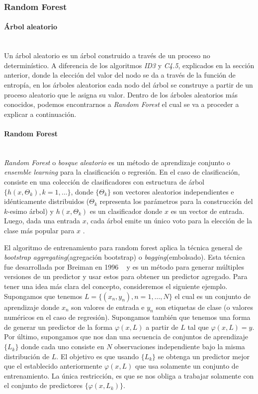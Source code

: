 \subsubsection{Random Forest}

	\paragraph{Árbol aleatorio} ~\\
	
	Un árbol aleatorio es un árbol construido a través de un proceso no determinístico. A diferencia de los algoritmos \textit{ID3} y \textit{C4.5}, explicados en la sección anterior, donde la elección del valor del nodo se da a través de la función de entropía, en los árboles aleatorios cada nodo del árbol se construye a partir de un proceso aleatorio que le asigna su valor. Dentro de los árboles aleatorios más conocidos, podemos encontrarnos a \textit{Random Forest} el cual se va a proceder a explicar a continuación.

	\paragraph{Random Forest} ~\\

	\textit{Random Forest} o \textit{bosque aleatorio} es un método de aprendizaje conjunto o\textit{ ensemble learning} para la clasificación o regresión. En el caso de clasificación, consiste en una colección de clasificadores con estructura de árbol $\{h(x,\Theta_k), k = 1,\dots\}$, donde $\{\Theta_k\}$ son vectores aleatorios independientes e idénticamente distribuidos ($\Theta_k$ representa los parámetros para la construcción del $k$-esimo árbol) y $h(x,\Theta_k)$ es un clasificador donde $x$ es un vector de entrada. Luego, dada una entrada $x$, cada árbol emite un único voto para la elección de la clase más popular para $x$ \cite{Breiman01}.

	El algoritmo de entrenamiento para random forest aplica la técnica general de \textit{bootstrap aggregating}(agregación bootstrap) o \textit{bagging}(embolsado). Esta técnica fue desarrollada por Breiman en 1996 ~\cite{LBreiman96} y es un método para generar múltiples versiones de un predictor y usar estos para obtener un predictor agregado. Para tener una idea más clara del concepto, consideremos el siguiente ejemplo. Supongamos que tenemos $L = \{ (x_n,y_n), n = 1,\dots, N \}$ el cual es un conjunto de aprendizaje donde $x_n$ son valores de entrada e $y_n$ son etiquetas de clase (o valores numéricos en el caso de regresión). Supongamos también que tenemos una forma de generar un predictor de la forma $\varphi(x,L)$ a partir de $L$ tal que $ \varphi(x,L) = y $. Por último, supongamos que nos dan una secuencia de conjuntos de aprendizaje $\{ L_k \}$ donde cada uno consiste en $N$ observaciones independiente bajo la misma distribución de $L$. El objetivo es que usando $\{ L_k \}$ se obtenga un predictor mejor que el establecido anteriormente $\varphi(x,L)$ que usa solamente un conjunto de entrenamiento. La única restricción, es que se nos obliga a trabajar solamente con el conjunto de predictores $\{ \varphi(x, L_k)\} $.

